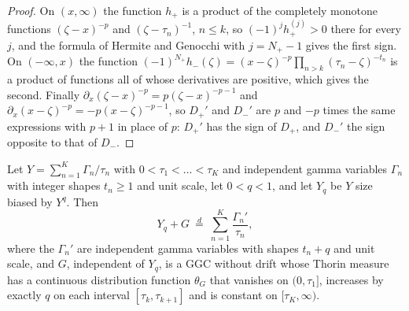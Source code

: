 \begin{proof}
On $(x,\infty)$ the function $h_+$ is a product of the completely monotone functions $(\zeta-x)^{-p}$ and $(\zeta-\tau_n)^{-1}$, $n\le k$, so $(-1)^jh_+^{(j)}>0$ there for every $j$, and the formula of Hermite and Genocchi with $j=N_+-1$ gives the first sign. On $(-\infty,x)$ the function $(-1)^{N_+}h_-(\zeta)=(x-\zeta)^{-p}\prod_{n>k}(\tau_n-\zeta)^{-t_n}$ is a product of functions all of whose derivatives are positive, which gives the second. Finally $\partial_x(\zeta-x)^{-p}=p(\zeta-x)^{-p-1}$ and $\partial_x(x-\zeta)^{-p}=-p(x-\zeta)^{-p-1}$, so $D_+'$ and $D_-'$ are $p$ and $-p$ times the same expressions with $p+1$ in place of $p$: $D_+'$ has the sign of $D_+$, and $D_-'$ the sign opposite to that of $D_-$.
\end{proof}

\begin{theorem}\label{fm:thm:sbp}
Let $Y=\sum_{n=1}^K\Gamma_n/\tau_n$ with $0<\tau_1<\dots<\tau_K$ and independent gamma variables $\Gamma_n$ with integer shapes $t_n\ge1$ and unit scale, let $0<q<1$, and let $Y_q$ be $Y$ size biased by $Y^q$. Then
\[
Y_q+G\ \overset d=\ \sum_{n=1}^K\frac{\Gamma_n'}{\tau_n},
\]
where the $\Gamma_n'$ are independent gamma variables with shapes $t_n+q$ and unit scale, and $G$, independent of $Y_q$, is a GGC without drift whose Thorin measure has a continuous distribution function $\theta_G$ that vanishes on $(0,\tau_1]$, increases by exactly $q$ on each interval $[\tau_k,\tau_{k+1}]$ and is constant on $[\tau_K,\infty)$.
\end{theorem}

